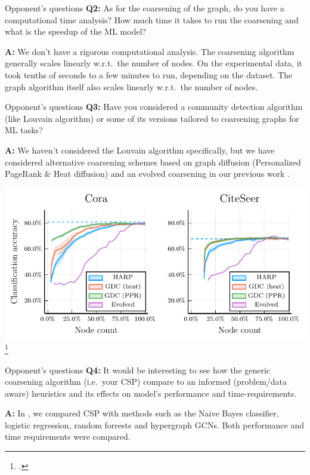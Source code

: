 \documentclass[10pt]{beamer}
\begin{document}
\begin{frame}{Opponent's questions}
	\textbf{Q2:} As for the coarsening of the graph, do you have a computational time analysis? How much time it takes to run the coarsening and what is the speedup of the ML model?

	\textbf{A:} We don't have a rigorous computational analysis. The coarsening algorithm generally scales linearly w.r.t.\ the number of nodes. On the experimental data, it took tenths of seconds to a few minutes to run, depending on the dataset. The graph algorithm itself also scales linearly w.r.t.\ the number of nodes.
\end{frame}

\begin{frame}{Opponent's questions}
	\textbf{Q3:} Have you considered a community detection algorithm (like Louvain algorithm) or some of its versions tailored to coarsening graphs for ML tasks?

	\textbf{A:} We haven't considered the Louvain algorithm specifically, but we have considered alternative coarsening schemes based on graph diffusion (Personalized PageRank \& Heat diffusion) and an evolved coarsening in our previous work \cite{dedic_adaptive_2022}.

	\centering
	\includegraphics[width=0.7\pagewidth]{images/alternative-coarsening-algorithms/alternative-coarsening-algorithms.pdf}\footcite{dedic_adaptive_2022}
\end{frame}

\begin{frame}{Opponent's questions}
	\textbf{Q4:} It would be interesting to see how the generic coarsening algorithm (i.e.\ your CSP) compare to an informed (problem/data aware) heuristics and its effects on model’s performance and time-requirements.

	\textbf{A:} In \cite{prochazka_convolutional_2024}, we compared CSP with methods such as the Naive Bayes classifier, logistic regression, random forrests and hypergraph GCNs. Both performance and time requirements were compared.
\end{frame}
\end{document}
